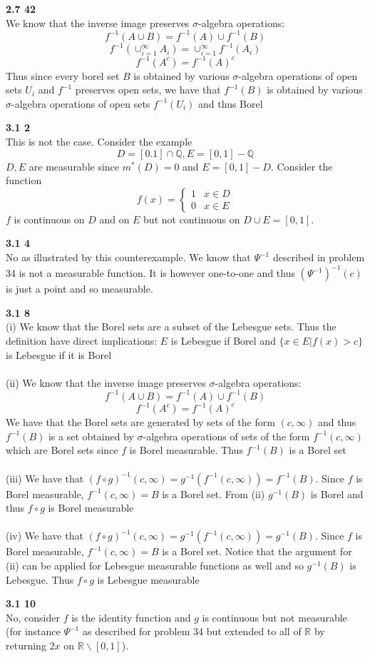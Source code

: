 \documentclass[12pt]{article}
\newenvironment{ques}[1]{\textbf{#1}\vspace{1 mm}\\ }{\bigskip}
\theoremstyle{definition}
\newcommand{\R}{\mathbb R}
\newcommand{\Q}{\mathbb Q}
\renewcommand{\-}{\backslash}
\begin{document}
\begin{ques}{2.7 42}
	We know that the inverse image preserves $\sigma$-algebra operations:
	$$f^{-1}(A \cup B) = f^{-1}(A) \cup f^{-1}(B)$$
	$$f^{-1}(\cup_{i=1}^\infty A_i) = \cup_{i=1}^\infty f^{-1}(A_i)$$
	$$f^{-1}(A^c) = f^{-1}(A)^c$$
	Thus since every borel set $B$ is obtained by various $\sigma$-algebra
	operations of open sets $U_i$ and $f^{-1}$ preserves open sets, we have that
	$f^{-1}(B)$ is obtained by various $\sigma$-algebra operations of open sets
	$f^{-1}(U_i)$ and thus Borel
\end{ques}

\begin{ques}{3.1 2}
	This is not the case. Consider the example
	$$D = [0.1] \cap \Q , E = [0,1] - \Q$$
	$D, E$ are measurable since $m^*(D) = 0$ and $E = [0,1] - D$. Consider the function
	$$f(x) = 
	\begin{cases}
	1 & x \in D\\
	0 & x \in E
	\end{cases}$$
	$f$ is continuous on $D$ and on $E$ but not continuous on $D \cup E =
	[0,1]$. 
\end{ques}

\begin{ques}{3.1 4}
	No as illustrated by this counterexample. We know that $\Psi^{-1}$
	described in problem 34 is not a measurable function.  It is however one-to-one
	and thus $(\Psi^{-1})^{-1}(c)$ is just a point and so measurable.
\end{ques}

\begin{ques}{3.1 8}
	(i)
	We know that the Borel sets are a subset of the Lebesgue sets. Thus the
	definition have direct implications: $E$ is Lebesgue if Borel and $\{x \in
	E|f(x) > c\}$ is Lebesgue if it is Borel\\
	\\
	(ii) We know that the inverse image preserves $\sigma$-algebra operations:
	$$f^{-1}(A \cup B) = f^{-1}(A) \cup f^{-1}(B)$$
	$$f^{-1}(A^c) = f^{-1}(A)^c$$
	We have that the Borel sets are generated by sets of the form $(c, \infty)$
	and thus $f^{-1}(B)$ is a set obtained by $\sigma$-algebra operations of
	sets of the form $f^{-1}(c, \infty)$ which are Borel sets since $f$ is
	Borel measurable. Thus $f^{-1}(B)$ is a Borel set\\
	\\
	(iii) We have that $(f \circ g)^{-1}(c, \infty) = g^{-1}(f^{-1}(c, \infty))
	= f^{-1}(B)$. Since $f$ is Borel measurable, $f^{-1}(c, \infty) = B$ is a
	Borel set. From (ii) $g^{-1}(B)$ is Borel and thus $f \circ g$ is Borel
	measurable\\
	\\
	(iv) We have that $(f \circ g)^{-1}(c, \infty) = g^{-1}(f^{-1}(c, \infty))
	= g^{-1}(B)$. Since $f$ is Borel measurable, $f^{-1}(c, \infty) = B$ is a
	Borel set. Notice that the argument for (ii) can be applied for Lebesgue
	measurable functions as well and so $g^{-1}(B)$ is Lebesgue. Thus $f
	\circ g$ is Lebesgue measurable
\end{ques}

\begin{ques}{3.1 10}
	No, consider $f$ is the identity function and $g$ is continuous but not
	measurable (for instance $\Psi^{-1}$ as described for problem 34 but
	extended to all of $\R$ by returning $2x$ on $\R \backslash [0,1]$).
\end{ques}
\end{document}
